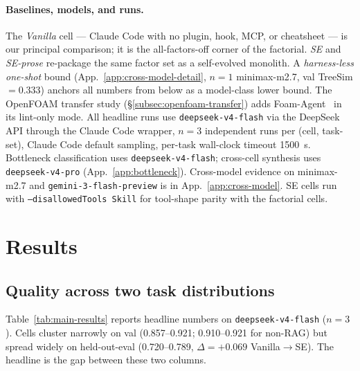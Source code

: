 \documentclass{article}
\begin{document}
\paragraph{Baselines, models, and runs.}\label{subsec:baselines} The \emph{Vanilla} cell --- Claude Code with no plugin, hook, MCP, or cheatsheet --- is our principal comparison; it is the all-factors-off corner of the factorial. \emph{SE} and \emph{SE-prose} re-package the same factor set as a self-evolved monolith. A \emph{harness-less one-shot} bound (App.~\ref{app:cross-model-detail}, $n=1$ minimax-m2.7, val TreeSim $= 0.333$) anchors all numbers from below as a model-class lower bound. The OpenFOAM transfer study (\S\ref{subsec:openfoam-transfer}) adds Foam-Agent~\citep{foamagent2025} in its lint-only mode. All headline runs use \texttt{deepseek-v4-flash} via the DeepSeek API through the Claude Code wrapper, $n=3$ independent runs per (cell, task-set), Claude Code default sampling, per-task wall-clock timeout 1500~s. Bottleneck classification uses \texttt{deepseek-v4-flash}; cross-cell synthesis uses \texttt{deepseek-v4-pro} (App.~\ref{app:bottleneck}). Cross-model evidence on minimax-m2.7 and \texttt{gemini-3-flash-preview} is in App.~\ref{app:cross-model}. SE cells run with \texttt{--disallowedTools Skill} for tool-shape parity with the factorial cells.


\section{Results}
\label{sec:results}

\subsection{Quality across two task distributions}
\label{subsec:quality}

Table~\ref{tab:main-results} reports headline numbers on \texttt{deepseek-v4-flash} ($n=3$). Cells cluster narrowly on val (0.857--0.921; 0.910--0.921 for non-RAG) but spread widely on held-out-eval (0.720--0.789, $\Delta = +0.069$ Vanilla$\to$SE). The headline is the gap between these two columns.
\end{document}
